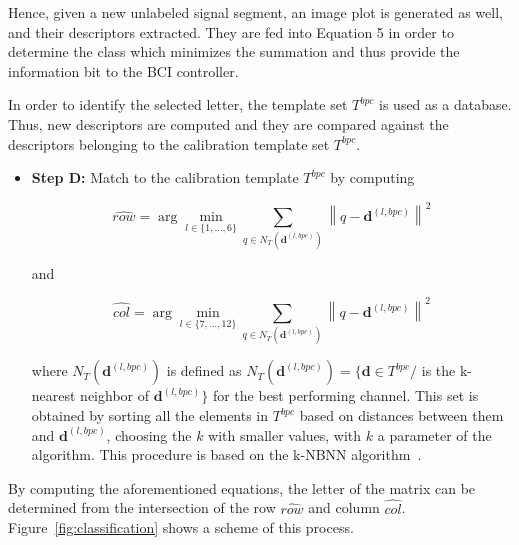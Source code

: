 Hence, given a new unlabeled signal segment, an image plot is generated as well, and their descriptors extracted.  They are fed into Equation 5 in order to determine the class which minimizes the summation and thus provide the information bit to the BCI controller.  


In order to identify the selected letter, the template set $T^{bpc}$ is used as a database.  Thus, new descriptors are computed and they are compared against the descriptors belonging to the calibration template set $T^{bpc}$.

\begin{itemize}

\item \textbf{Step D:} Match to the calibration template $T^{bpc}$ by computing  

\begin{equation}
\hat{row} = \arg \min_{l \in \{1,\dots,6\}} \sum_{q \in N_T(\mathbf{d}^{(l,bpc)})}^{} {\left\lVert q -  \mathbf{d}^{(l,bpc)} \right\rVert}  ^{2}
\label{eq:multiclassificationrow}
\end{equation}

\noindent and

\begin{equation}
\hat{col} = \arg \min_{l \in \{7,\dots,12\}} \sum_{q \in N_T(\mathbf{d}^{(l,bpc)})}^{} {\left\lVert q -  \mathbf{d}^{(l,bpc)} \right\rVert} ^{2}
\label{eq:multiclassificationcol}
\end{equation}

\noindent where $N_T(\mathbf{d}^{(l,bpc)})$  is defined as $N_T(\mathbf{d}^{(l,bpc)}) = \{\mathbf{d} \in T^{bpc} / $  is the k-nearest neighbor of $ \mathbf{d}^{(l,bpc)} \}$ for the best performing channel.  This set is obtained by sorting all the elements in $T^{bpc}$ based on distances between them and $\mathbf{d}^{(l,bpc)}$, choosing the $k$ with smaller values, with $k$ a parameter of the algorithm.  This procedure is based on the k-NBNN  algorithm~\cite{Boiman2008}.

\end{itemize}
By computing the aforementioned equations, the letter of the matrix can be determined from the intersection of the row $ \hat{row} $ and column $ \hat{col} $. 
Figure~\ref{fig:classification} shows a scheme of this process. 

